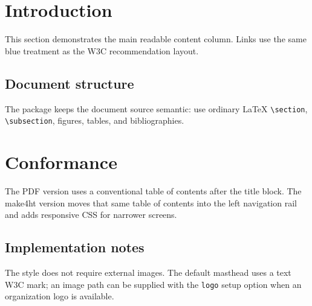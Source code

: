 \documentclass[11pt,letterpaper]{article}
\begin{document}
\WThreeCStart
\maketitle
{}
\WThreeCContents



\section{Introduction}

This section demonstrates the main readable content column. Links use the same
blue treatment as the W3C recommendation layout.

\subsection{Document structure}

The package keeps the document source semantic: use ordinary \LaTeX{}
\verb|\section|, \verb|\subsection|, figures, tables, and bibliographies.

\section{Conformance}

The PDF version uses a conventional table of contents after the title block.
The make4ht version moves that same table of contents into the left navigation
rail and adds responsive CSS for narrower screens.

\subsection{Implementation notes}

The style does not require external images. The default masthead uses a text
W3C mark; an image path can be supplied with the \verb|logo| setup option when
an organization logo is available.

\WThreeCEnd
\end{document}
